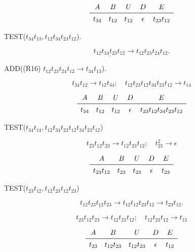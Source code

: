\documentclass{article}
\begin{document}
\[
\begin{array}{ccccc}
A & B & U & D & E \\
\midrule
t_{34} & t_{12} & t_{12} & \epsilon  & t_{23} t_{12}
\end{array}
\]

TEST($t_{34}t_{13}, t_{12} t_{34} t_{23} t_{12}$).

\[t_{12} \underline{t_{34} t_{23}} t_{12} \rightarrow t_{12} t_{23} t_{24} t_{12}.\]

ADD((R16) $t_{12} t_{23} t_{24} t_{12} \rightarrow t_{34}t_{13}$).


\[
t_{34} t_{12} \rightarrow t_{12} t_{34}; \quad
t_{12} t_{23} t_{12} t_{34} t_{23} t_{12} \rightarrow t_{14}
\]

\[
\begin{array}{ccccc}
A & B & U & D & E \\
\midrule
t_{34} & t_{12} & t_{12} & \epsilon & t_{23} t_{12} t_{34} t_{23} t_{12}
\end{array}
\]

TEST($t_{34}t_{14}, t_{12} t_{34}t_{23} t_{12} t_{34} t_{23} t_{12}$)

\[
t_{23} t_{12} t_{23} \rightarrow t_{12} t_{23} t_{12}; \quad t_{23}^2 \rightarrow \epsilon
\]

\[
\begin{array}{ccccc}
A & B & U & D & E \\
\midrule 
t_{23} t_{12} & t_{23} & t_{23} & \epsilon  & t_{23} \\
\end{array}
\]

TEST($t_{23} t_{12}, t_{12} t_{23} t_{12} t_{23}$)

\[t_{12} \underline{t_{23} t_{12} t_{23}} \rightarrow {t_{12} t_{12}} t_{23} t_{12} \rightarrow t_{23} t_{12}.\]


\[
t_{23} t_{12} t_{23} \rightarrow t_{12} t_{23} t_{12}; \quad t_{12} t_{23} t_{12} \rightarrow t_{13}
\]

\[
\begin{array}{ccccc}
A & B & U & D & E \\
\midrule
t_{23} & t_{12} t_{23}& t_{12} t_{23}& \epsilon & t_{12} \\
\end{array}
\]
\end{document}
